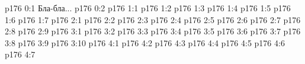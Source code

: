 \author{Промежуточные создания}
\vs p176 0:1  Бла-бла...
\vs p176 0:2 
\vs p176 1:1 
\vs p176 1:2 
\vs p176 1:3 
\vs p176 1:4 
\vs p176 1:5 
\vs p176 1:6 
\vs p176 1:7 
\vs p176 2:1 
\vs p176 2:2 
\vs p176 2:3 \pc 
\vs p176 2:4 
\vs p176 2:5 
\vs p176 2:6 
\vs p176 2:7 
\vs p176 2:8 
\vs p176 2:9 
\vs p176 3:1 
\vs p176 3:2 \pc 
\vs p176 3:3 
\vs p176 3:4 
\vs p176 3:5 
\vs p176 3:6 
\vs p176 3:7 \pc 
\vs p176 3:8 
\vs p176 3:9 
\vs p176 3:10 
\vs p176 4:1 
\vs p176 4:2 
\vs p176 4:3 
\vs p176 4:4 
\vs p176 4:5 
\vs p176 4:6 
\vs p176 4:7 
\quizlink
